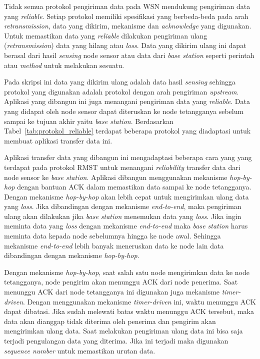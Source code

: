 \documentclass[a4paper,twoside]{article}
\begin{document}
\begin{enumerate}
Tidak semua protokol pengiriman data pada WSN mendukung pengiriman data yang \textit{reliable}. Setiap protokol memiliki spesifikasi yang berbeda-beda pada arah \textit{retransmission}, data yang dikirim, mekanisme dan \textit{acknowledge} yang digunakan. Untuk memastikan data yang \textit{reliable} dilakukan pengiriman ulang (\textit{retransmission}) data yang hilang atau \textit{loss}. Data yang dikirim ulang ini dapat berasal dari hasil \textit{sensing} node sensor atau data dari \textit{base station} seperti perintah atau \textit{method} untuk melakukan sesuatu. 

Pada skripsi ini data yang dikirim ulang adalah data hasil \textit{sensing} sehingga protokol yang digunakan adalah protokol dengan arah pengiriman \textit{upstream}. Aplikasi yang dibangun ini juga menangani pengiriman data yang \textit{reliable}. Data yang didapat oleh node sensor dapat diteruskan ke node tetangganya sebelum sampai ke tujuan akhir yaitu \textit{base station}. Berdasarkan Tabel~\ref{tab:protokol_reliable} terdapat beberapa protokol yang diadaptasi untuk membuat aplikasi transfer data ini.

Aplikasi transfer data yang dibangun ini mengadaptasi beberapa cara yang yang terdapat pada protokol RMST untuk menangani \textit{reliability} transfer data dari node sensor ke \textit{base station}. Aplikasi dibangun menggunakan mekanisme \textit{hop-by-hop} dengan bantuan ACK dalam memastikan data sampai ke node tetangganya. Dengan mekanisme \textit{hop-by-hop} akan lebih cepat untuk mengirimkan ulang data yang \textit{loss}. Jika dibandingan dengan mekanisme \textit{end-to-end}, maka pengiriman ulang akan dilakukan jika \textit{base station} menemukan data yang \textit{loss}. Jika ingin meminta data yang \textit{loss} dengan mekanisme \textit{end-to-end} maka \textit{base station} harus meminta data kepada node sebelumnya hingga ke node awal. Sehingga mekanisme \textit{end-to-end} lebih banyak meneruskan data ke node lain data dibandingan dengan mekanisme \textit{hop-by-hop}.

Dengan mekanisme \textit{hop-by-hop}, saat salah satu node mengirimkan data ke node tetangganya, node pengirim akan menunggu ACK dari node penerima. Saat menunggu ACK dari node tetangganya ini digunakan juga mekanisme \textit{timer-driven}. Dengan menggunakan mekanisme \textit{timer-driven} ini, waktu menunggu ACK dapat dibatasi. Jika sudah melewati batas waktu menunggu ACK tersebut, maka data akan dianggap tidak diterima oleh penerima dan pengirim akan mengirimkan ulang data. Saat melakukan pengiriman ulang data ini bisa saja terjadi pengulangan data yang diterima. Jika ini terjadi maka digunakan \textit{sequence number} untuk memastikan urutan data.


\end{enumerate}
\end{document}
